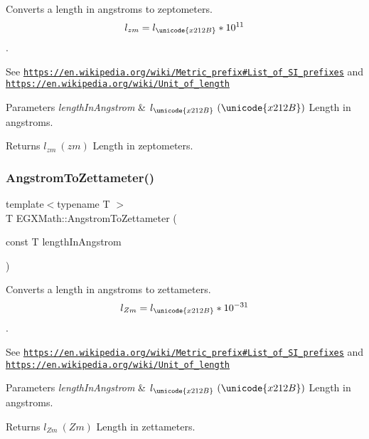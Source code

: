 Converts a length in angstroms to zeptometers. \[ l_{zm}=l_{\unicode{x212B}} * 10^{11} \]. 

See \href{https://en.wikipedia.org/wiki/Metric_prefix#List_of_SI_prefixes}{\tt https\+://en.\+wikipedia.\+org/wiki/\+Metric\+\_\+prefix\#\+List\+\_\+of\+\_\+\+S\+I\+\_\+prefixes} and \href{https://en.wikipedia.org/wiki/Unit_of_length}{\tt https\+://en.\+wikipedia.\+org/wiki/\+Unit\+\_\+of\+\_\+length} 
\begin{DoxyParams}{Parameters}
{\em length\+In\+Angstrom} & $ l_{\unicode{x212B}}\ (\unicode{x212B})$ Length in angstroms. \\
\hline
\end{DoxyParams}
\begin{DoxyReturn}{Returns}
$ l_{zm}\ (zm)$ Length in zeptometers. 
\end{DoxyReturn}
\mbox{\label{group___e_g_x_math-_conversions-_length_conversions-_non-_s_i-_angstrom-_s_i_ga0af804446e88f9b27f2e278727a5a120}} 
\subsubsection{\texorpdfstring{Angstrom\+To\+Zettameter()}{AngstromToZettameter()}}
{\footnotesize\ttfamily template$<$typename T $>$ \\
T E\+G\+X\+Math\+::\+Angstrom\+To\+Zettameter (\begin{DoxyParamCaption}\item[{const T}]{length\+In\+Angstrom }\end{DoxyParamCaption})}



Converts a length in angstroms to zettameters. \[ l_{Zm}=l_{\unicode{x212B}} * 10^{-31} \]. 

See \href{https://en.wikipedia.org/wiki/Metric_prefix#List_of_SI_prefixes}{\tt https\+://en.\+wikipedia.\+org/wiki/\+Metric\+\_\+prefix\#\+List\+\_\+of\+\_\+\+S\+I\+\_\+prefixes} and \href{https://en.wikipedia.org/wiki/Unit_of_length}{\tt https\+://en.\+wikipedia.\+org/wiki/\+Unit\+\_\+of\+\_\+length} 
\begin{DoxyParams}{Parameters}
{\em length\+In\+Angstrom} & $ l_{\unicode{x212B}}\ (\unicode{x212B})$ Length in angstroms. \\
\hline
\end{DoxyParams}
\begin{DoxyReturn}{Returns}
$ l_{Zm}\ (Zm)$ Length in zettameters. 
\end{DoxyReturn}
